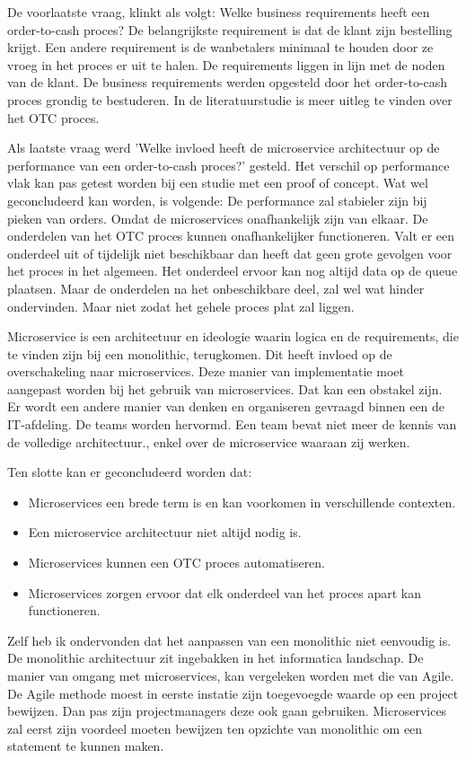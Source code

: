 De voorlaatste vraag, klinkt als volgt: Welke business requirements heeft een order-to-cash proces?
De belangrijkste requirement is dat de klant zijn bestelling krijgt. Een andere requirement is de wanbetalers minimaal te houden door ze vroeg in het proces er uit te halen. De requirements liggen in lijn met de noden van de klant. De business requirements werden opgesteld door het order-to-cash proces grondig te bestuderen. In de literatuurstudie is meer uitleg te vinden over het OTC proces.

Als laatste vraag werd 'Welke invloed heeft de microservice architectuur op de performance van een order-to-cash proces?' gesteld.
Het verschil op performance vlak kan pas getest worden bij een studie met een proof of concept. Wat wel geconcludeerd kan worden, is volgende: De performance zal stabieler zijn bij pieken van orders. Omdat de microservices onafhankelijk zijn van elkaar. De onderdelen van het OTC proces kunnen onafhankelijker functioneren. Valt er een onderdeel uit of tijdelijk niet beschikbaar dan heeft dat geen grote gevolgen voor het proces in het algemeen. Het onderdeel ervoor kan nog altijd data op de queue plaatsen. Maar de onderdelen na het onbeschikbare deel, zal wel wat hinder ondervinden. Maar niet zodat het gehele proces plat zal liggen.


Microservice is een architectuur en ideologie waarin logica en de requirements, die te vinden zijn bij een monolithic, terugkomen. Dit heeft invloed op de overschakeling naar microservices. Deze manier van implementatie moet aangepast worden bij het gebruik van microservices. Dat kan een obstakel zijn. Er wordt een andere manier van denken en organiseren gevraagd binnen een de IT-afdeling. De teams worden hervormd. Een team bevat niet meer de kennis van de volledige architectuur., enkel over de microservice waaraan zij werken. 


Ten slotte kan er geconcludeerd worden dat:
\begin{itemize}
	\item Microservices een brede term is en kan voorkomen in verschillende contexten.
	\item Een microservice architectuur niet altijd nodig is.
	\item Microservices kunnen een OTC proces automatiseren.
	\item Microservices zorgen ervoor dat elk onderdeel van het proces apart kan functioneren.
\end{itemize}

Zelf heb ik ondervonden dat het aanpassen van een monolithic niet eenvoudig is. De monolithic architectuur zit ingebakken in het informatica landschap. De manier van omgang met microservices, kan vergeleken worden met die van Agile. De Agile methode moest in eerste instatie zijn toegevoegde waarde op een project bewijzen. Dan pas zijn projectmanagers deze ook gaan gebruiken. Microservices zal eerst zijn voordeel moeten bewijzen ten opzichte van monolithic om een statement te kunnen maken.



